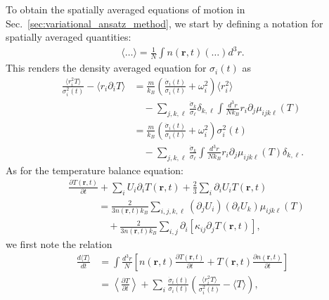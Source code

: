 \documentclass[reprint, amsmath, amssymb, aps, superscriptaddress]{revtex4-1}
\begin{document}
To obtain the spatially averaged equations of motion in Sec.~\ref{sec:variational_ansatz_method}, we start by defining a notation for spatially averaged quantities:
\begin{align} \label{eq:spatial_average}
    \langle \ldots \rangle 
    =
    \frac{ 1 }{ N }
    \int 
    n(\boldsymbol{r}, t)
    \left( \ldots \right)
    d^3 r.
\end{align}
This renders the density averaged equation for $\sigma_i(t)$ as
\begin{align} \label{eq:averaged_sigma_diffEQ}
    \frac{ \langle r_i^2 T \rangle }{ \sigma_i^2(t) }
    -
    \langle r_i \partial_i T \rangle 
    &= 
    \frac{ m }{ k_B }
    \left(
    \frac{ \ddot{\sigma}_i(t) }{ \sigma_i(t) }
    +
    \omega_i^2
    \right) 
    \langle r_i^2 \rangle \nonumber\\ %
    &\quad -
    \sum_{j, k, \ell} 
    \frac{ \dot{\sigma}_k }{ \sigma_{\ell} }
    \delta_{k, \ell}
    \int \frac{ d^3 r }{ N k_B }
    r_i \partial_j \mu_{i j k \ell}(T) \nonumber\\ 
    &=
    \frac{ m }{ k_B }
    \left(
    \frac{ \ddot{\sigma}_i(t) }{ \sigma_i(t) } 
    +
    \omega_i^2 
    \right)
    \sigma_i^2(t) \\ %
    &\quad -
    \sum_{j, k, \ell} 
    \frac{ \dot{\sigma}_k }{ \sigma_{\ell} }
    \int \frac{ d^3 r }{ N k_B }
    r_i \partial_j \mu_{i j k \ell}(T)
    \delta_{k, \ell}. \nonumber
\end{align}
As for the temperature balance equation:
\begin{align}
    & \frac{ \partial T(\boldsymbol{r}, t) }{ \partial t }
    + 
    \sum_i U_i \partial_i T(\boldsymbol{r}, t)
    +
    \frac{ 2 }{ 3 } 
    \sum_i 
    \partial_i U_i
    T(\boldsymbol{r}, t) \nonumber\\
    &\quad\quad\quad =
    \frac{ 2 }{ 3 n(\boldsymbol{r}, t) k_B }
    \sum_{i, j, k, \ell}  
    ( \partial_{j} U_i )
    ( \partial_{\ell} U_k )
    \mu_{i j k \ell}(T)
    \nonumber\\ 
    &\quad\quad\quad\quad +
    \frac{ 2 }{ 3 n(\boldsymbol{r}, t) k_B }
    \sum_{i, j}
    \partial_i \left[ \kappa_{i j} \partial_j T(\boldsymbol{r}, t) \right], 
\end{align}
we first note the relation
\begin{align}
    \frac{ d \langle T \rangle }{ d t }
    &=
    \int 
    \frac{ d^3 r }{ N }
    \left[
    n(\boldsymbol{r}, t)
    \frac{ \partial T(\boldsymbol{r}, t) }{ \partial t }
    +
    T(\boldsymbol{r}, t)
    \frac{ \partial n(\boldsymbol{r}, t) }{ \partial t }
    \right] \nonumber\\
    &=
    \left\langle 
    \frac{ \partial T }{ \partial t }
    \right\rangle
    +
    \sum_i
    \frac{ \dot{\sigma}_i(t) }{ \sigma_i(t) }
    \left(
    \frac{ \langle r_i^2 T \rangle }{ \sigma_i^2(t) }
    -
    \langle T \rangle
    \right),
\end{align}
\end{document}
